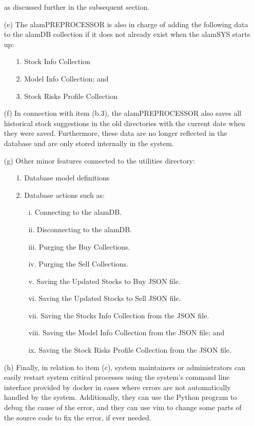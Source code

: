 \begin{itemize}
    as discussed further in the subsequent section.
    \item[(e)] The alamPREPROCESSOR is also in charge of adding the following data to the alamDB collection if 
    it does not already exist when the alamSYS starts up:
    \begin{itemize}
        \item[1.] Stock Info Collection
        \item[2.] Model Info Collection; and
        \item[3.] Stock Risks Profile Collection
    \end{itemize}
    \item[(f)] In connection with item (b.3), the alamPREPROCESSOR also saves all historical stock suggestions in 
    the old directories with the current date when they were saved. Furthermore, these data are no longer reflected in 
    the database and are only stored internally in the system.
    \item[(g)] Other minor features connected to the utilities directory:
    \begin{itemize}
        \item[1.] Database model definitions
        \item[2.] Database actions such as:
        \begin{itemize}
            \item[i.] Connecting to the alamDB.
            \item[ii.] Disconnecting to the alamDB.
            \item[iii.] Purging the Buy Collections.
            \item[iv.] Purging the Sell Collections.
            \item[v.] Saving the Updated Stocks to Buy JSON file.
            \item[vi.] Saving the Updated Stocks to Sell JSON file.
            \item[vii.] Saving the Stocks Info Collection from the JSON file.
            \item[viii.] Saving the Model Info Collection from the JSON file; and
            \item[ix.] Saving the Stock Risks Profile Collection from the JSON file.
        \end{itemize} 
    \end{itemize}
    \item[(h)] Finally, in relation to item (c), system maintainers or administrators can easily restart system critical 
    processes using the system's command line interface provided by docker in cases where errors are not automatically 
    handled by the system. Additionally, they can use the Python program to debug the cause of the error, and they can 
    use vim to change some parts of the source code to fix the error, if ever needed.
\end{itemize}

